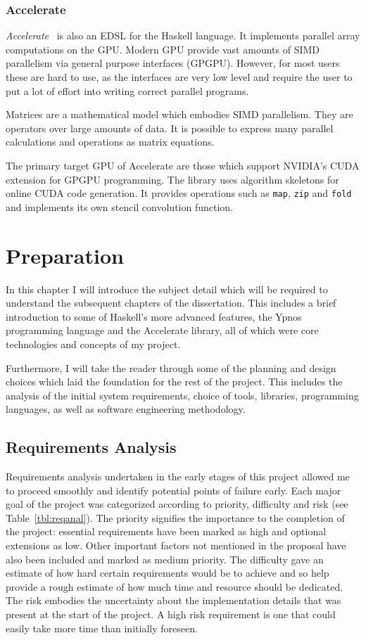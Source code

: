 \documentclass[12pt,a4paper,oneside]{scrbook}
\begin{document}
\subsection{Accelerate}

\emph{Accelerate}~\cite{acc-damp11} is also an EDSL for the Haskell language.
It implements parallel array computations on the GPU. Modern GPU provide vast
amounts of SIMD parallelism via general purpose interfaces (GPGPU). However, for
most users these are hard to use, as the interfaces are very low level and
require the user to put a lot of effort into writing correct parallel programs.

Matrices are a mathematical model which embodies SIMD parallelism. They are
operators over large amounts of data. It is possible to express many parallel
calculations and operations as matrix equations.

The primary target GPU of Accelerate are those which support NVIDIA's CUDA
extension for GPGPU programming. The library uses algorithm skeletons for online
CUDA code generation. It provides operations such as \texttt{map}, \texttt{zip}
and \texttt{fold} and implements its own stencil convolution function.


\chapter{Preparation}

In this chapter I will introduce the subject detail which will be required to
understand the subsequent chapters of the dissertation. This includes a brief
introduction to some of Haskell's more advanced features, the Ypnos programming
language and the Accelerate library, all of which were core technologies and
concepts of my project.

Furthermore, I will take the reader through some of the planning and design
choices which laid the foundation for the rest of the project. This includes the
analysis of the initial system requirements, choice of tools, libraries,
programming languages, as well as software engineering methodology.

\section{Requirements Analysis}

Requirements analysis undertaken in the early stages of this project allowed me
to proceed smoothly and identify potential points of failure early. Each major
goal of the project was categorized according to priority, difficulty and
risk (see Table~\ref{tbl:reqanal}). The priority signifies the importance to the completion of the project:
essential requirements have been marked as high and optional extensions as
low. Other important factors not mentioned in the proposal have also been
included and marked as medium priority. The difficulty gave an estimate of how
hard certain requirements would be to achieve and so help provide a rough
estimate of how much time and resource should be dedicated. The risk embodies
the uncertainty about the implementation details that was present at the start
of the project. A high risk requirement is one that could easily take more time
than initially foreseen.
\end{document}
